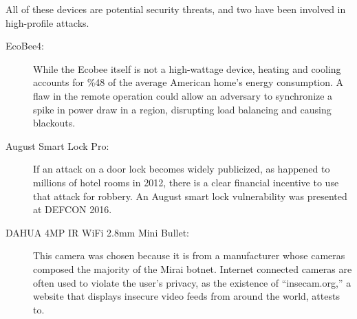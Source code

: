 \begin{mdframed}[backgroundcolor=gray!10]
All of these devices are potential security threats, and two have been involved in high-profile attacks.

\begin{description}
\item[EcoBee4:] While the Ecobee itself is not a high-wattage device, heating and cooling accounts for \%48 of the average American home’s energy consumption. A flaw in the remote operation could allow an adversary to synchronize a spike in power draw in a region, disrupting load balancing and causing blackouts.
\item[August Smart Lock Pro:] If an attack on a door lock becomes widely publicized, as happened to millions of hotel rooms in 2012, there is a clear financial incentive to use that attack for robbery. An August smart lock vulnerability was presented at DEFCON 2016.
\item[DAHUA 4MP IR WiFi 2.8mm Mini Bullet:] This camera was chosen because it is from a manufacturer whose cameras composed the majority of the Mirai botnet. Internet connected cameras are often used to violate the user’s privacy, as the existence of “insecam.org,” a website that displays insecure video feeds from around the world, attests to.
\end{description}

\end{mdframed}
